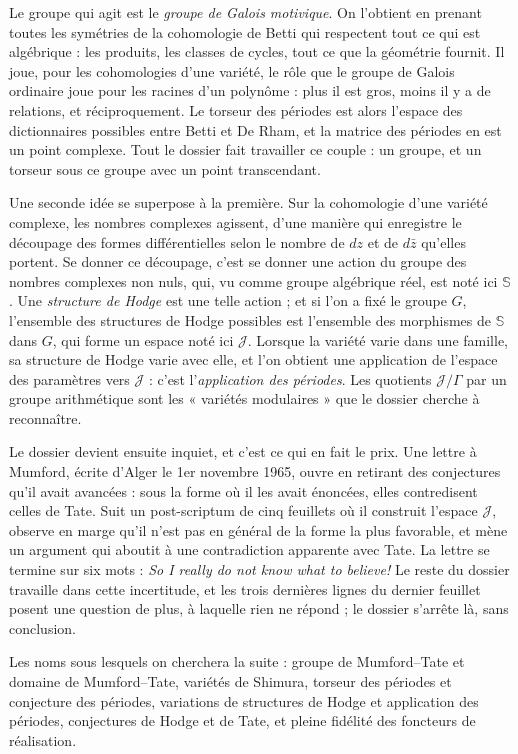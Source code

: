 \documentclass[11pt,a4paper]{article}
\begin{document}
\begin{resume}
Le groupe qui agit est le \emph{groupe de Galois motivique}. On l'obtient en
prenant toutes les symétries de la cohomologie de Betti qui respectent tout ce
qui est algébrique : les produits, les classes de cycles, tout ce que la
géométrie fournit. Il joue, pour les cohomologies d'une variété, le rôle que le
groupe de Galois ordinaire joue pour les racines d'un polynôme : plus il est
gros, moins il y a de relations, et réciproquement. Le torseur des périodes est
alors l'espace des dictionnaires possibles entre Betti et De Rham, et la matrice
des périodes en est un point complexe. Tout le dossier fait
travailler ce couple : un groupe, et un torseur sous ce groupe avec un point
transcendant.

Une seconde idée se superpose à la première. Sur la cohomologie d'une variété
complexe, les nombres complexes agissent, d'une manière qui enregistre le
découpage des formes différentielles selon le nombre de $dz$ et de
$d\bar{z}$ qu'elles portent. Se donner ce découpage, c'est se donner une action
du groupe des nombres complexes non nuls, qui, vu comme groupe algébrique réel,
est noté ici $\mathbb{S}$. Une \emph{structure de Hodge} est une telle
action ; et si l'on a fixé le groupe $G$, l'ensemble des
structures de Hodge possibles est l'ensemble des morphismes de $\mathbb{S}$
dans $G$, qui forme un espace noté ici $\mathcal{J}$. Lorsque la variété varie
dans une famille, sa structure de Hodge varie avec elle, et l'on obtient une
application de l'espace des paramètres vers $\mathcal{J}$ : c'est l'\emph{application
des périodes}. Les quotients $\mathcal{J}/\Gamma$ par un groupe arithmétique
sont les « variétés modulaires » que le dossier cherche à reconnaître.

Le dossier devient ensuite inquiet, et c'est ce qui en fait le prix. Une
lettre à Mumford, écrite d'Alger le 1er novembre 1965, ouvre en retirant des
conjectures qu'il avait avancées : sous la forme où il les avait énoncées, elles
contredisent celles de Tate. Suit un post-scriptum de cinq feuillets où il
construit l'espace $\mathcal{J}$, observe en marge qu'il n'est pas en général de
la forme la plus favorable, et mène un argument qui aboutit à une contradiction
apparente avec Tate. La lettre se termine sur six mots : \emph{So I really do not
know what to believe!} Le reste du dossier travaille dans cette incertitude, et
les trois dernières lignes du dernier feuillet posent une question de plus, à
laquelle rien ne répond ; le dossier s'arrête là, sans conclusion.

Les noms sous lesquels on cherchera la suite : groupe de Mumford--Tate et
domaine de Mumford--Tate, variétés de Shimura, torseur des périodes et
conjecture des périodes, variations de structures de Hodge et application des
périodes, conjectures de Hodge et de Tate, et pleine fidélité des foncteurs de
réalisation.


\end{resume}
\end{document}
